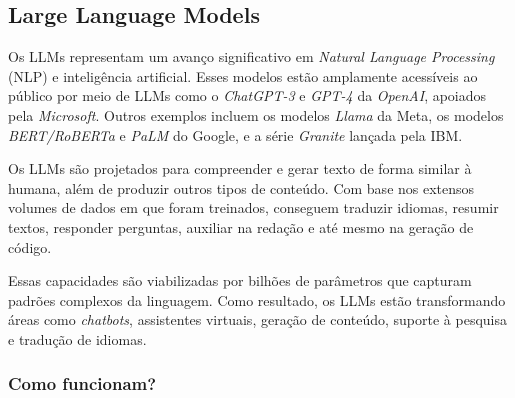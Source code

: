 \documentclass[a4paper, 12pt]{article}
\newcommand{\citeb}[1]{\bibleftbracket\cite{#1}\bibrightbracket}
\begin{document}

    \subsection{Large Language Models}


    Os LLMs representam um avanço significativo em \textit{Natural Language Processing} (NLP) e inteligência artificial. Esses modelos estão amplamente acessíveis ao público por meio de LLMs como o \textit{ChatGPT-3} e \textit{GPT-4} da \textit{OpenAI}, apoiados pela \textit{Microsoft}. Outros exemplos incluem os modelos \textit{Llama} da Meta, os modelos \textit{BERT/RoBERTa} e \textit{PaLM} do Google, e a série \textit{Granite} lançada pela IBM.

    Os LLMs são projetados para compreender e gerar texto de forma similar à humana, além de produzir outros tipos de conteúdo. Com base nos extensos volumes de dados em que foram treinados, conseguem traduzir idiomas, resumir textos, responder perguntas, auxiliar na redação e até mesmo na geração de código.

    Essas capacidades são viabilizadas por bilhões de parâmetros que capturam padrões complexos da linguagem. Como resultado, os LLMs estão transformando áreas como \textit{chatbots}, assistentes virtuais, geração de conteúdo, suporte à pesquisa e tradução de idiomas.

    \subsubsection{Como funcionam?}
\end{document}
